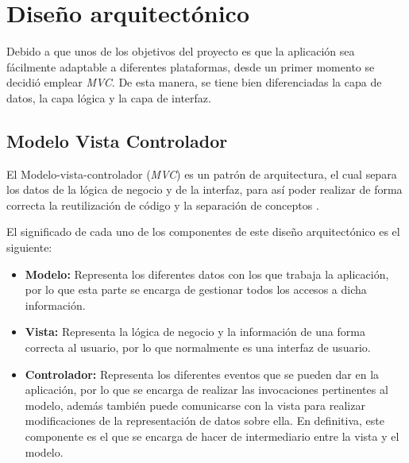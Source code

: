 



\newpage

\section{Diseño arquitectónico}

Debido a que unos de los objetivos del proyecto es que la aplicación sea fácilmente adaptable a diferentes plataformas, desde un primer momento se decidió emplear \textit{MVC}. De esta manera, se tiene bien diferenciadas la capa de datos, la capa lógica y la capa de interfaz.

\subsection{Modelo Vista Controlador}

El Modelo-vista-controlador (\textit{MVC}) es un patrón de arquitectura, el cual separa los datos de la lógica de negocio y de la interfaz, para así poder realizar de forma correcta la reutilización de código y la separación de conceptos \cite{mvc:info}.


El significado de cada uno de los componentes de este diseño arquitectónico es el siguiente:

\begin{itemize}
	\tightlist
	\item 
	\textbf{Modelo:} Representa los diferentes datos con los que trabaja la aplicación, por lo que esta parte se encarga de gestionar todos los accesos a dicha información.
	\item 
	\textbf{Vista:} Representa la lógica de negocio y la información de una forma correcta al usuario, por lo que normalmente es una interfaz de usuario.
	\item 
	\textbf{Controlador:} Representa los diferentes eventos que se pueden dar en la aplicación, por lo que se encarga de realizar las invocaciones pertinentes al modelo, además también puede comunicarse con la vista para realizar modificaciones de la representación de datos sobre ella. En definitiva, este componente es el que se encarga de hacer de intermediario entre la vista y el modelo.
	
\end{itemize}

